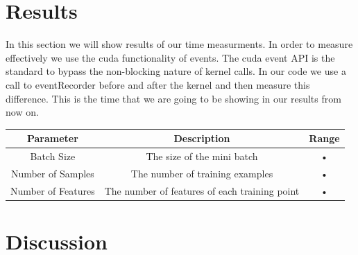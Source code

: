 \documentclass[11pt,a4paper]{article}
\begin{document}
\section{Results}
In this section we will show results of our time measurments. In order to measure effectively we use the cuda functionality of events. The cuda event API is the standard to bypass the non-blocking nature of kernel calls. In our code we use a call to eventRecorder before and after the kernel and then measure this difference. This is the time that we are going to be showing in our results from now on. 

\begin{tabular}{|c|c|c|}
\hline 
Parameter & Description & Range \\ 
\hline 
Batch Size & The size of the mini batch & • \\ 
\hline 
Number of Samples & The number of training examples & • \\ 
\hline 
Number of Features & The number of features of each training point & • \\ 
\hline 
\end{tabular} 

\section{Discussion}



\end{document}
